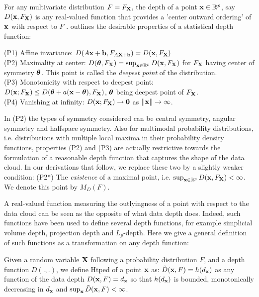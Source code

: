 \documentclass[10pt]{book}
\begin{document}
For any multivariate distribution $F = F_{\mathbf{X}}$, the depth of a point ${\bf{x}} \in \mathbb{R}^p$, say $D({\bf{x}}, F_{\mathbf{X}})$ is any real-valued function that provides a 'center outward ordering' of ${\bf{x}}$ with respect to $F$ \citep{zuo00}. \cite{liu90} outlines the desirable properties of a statistical depth function:

\noindent
(P1) Affine invariance: $D(A{\bf{x}} + {\bf{b}}, F_{A{\mathbf{X}}+{\bf{b}}}) = D({\bf{x}}, F_{\mathbf{X}})$\\
(P2) Maximality at center: $D({\boldsymbol{\theta}}, F_{\mathbf{X}}) = \sup_{{\bf{x}}\in \mathbb{R}^p} D({\bf{x}}, F_{\mathbf{X}})$ for $F_{\mathbf{X}}$ having center of symmetry ${\boldsymbol{\theta}}$. This point is called the \textit{deepest point} of the distribution.\\
(P3) Monotonicity with respect to deepest point: $D({\bf{x}}; F_{\mathbf{X}}) \leq D({\boldsymbol{\theta}} + a({\bf{x}} - {\boldsymbol{\theta}}), F_{\mathbf{X}})$, ${\boldsymbol{\theta}}$ being deepest point of $F_{\mathbf{X}}$.\\
(P4) Vanishing at infinity: $D({\bf{x}}; F_{\mathbf{X}}) \rightarrow \bf0$ as $\|{\bf{x}}\| \rightarrow \infty $.

In (P2) the types of symmetry considered can be central symmetry, angular symmetry and halfspace symmetry. Also for multimodal probability distributions, i.e. distributions with multiple local maxima in their probability density functions, properties (P2) and (P3) are actually restrictive towards the formulation of a reasonable depth function that captures the shape of the data cloud. In our derivations that follow, we replace these two by a slightly weaker condition: (P2*) The \textit{existence} of a maximal point, i.e. $ \sup_{{\bf{x}}\in \mathbb{R}^p} D({\bf{x}}, F_{\mathbf{X}}) < \infty $. We denote this point by $M_D(F)$.

A real-valued function measuring the outlyingness of a point with respect to the data cloud can be seen as the opposite of what data depth does. Indeed, such functions have been used to define several depth functions, for example simplicial volume depth, projection depth and $L_p$-depth. Here we give a general definition of such functions as a transformation on any depth function:

\begin{Definition}
Given a random variable ${\mathbf{X}}$ following a probability distribution $F$, and a depth function $D(.,.)$, we define Htped of a point ${\bf{x}}$ as: $\tilde D({\bf{x}}, F) = h(d_{\bf{x}})$ as any function of the data depth $D({\bf{x}}, F) = d_{\bf{x}}$ so that $h(d_{\bf{x}})$ is bounded, monotonically decreasing in $d_{\bf{x}}$ and $\sup_{\bf{x}} \tilde D({\bf{x}}, F) < \infty$.
\end{Definition}
\end{document}
